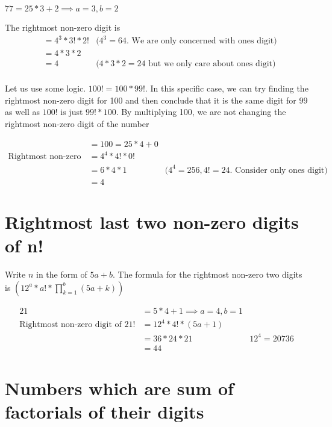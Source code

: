 
$77 = 25 * 3 + 2 \implies a = 3, b = 2$

The rightmost non-zero digit is 
\begin{align*}
    &= 4^3 * 3! * 2! &\text{($4^3 = 64$. We are only concerned with ones digit)} \\
    &= 4 * 3 * 2 \\
    &= 4 &\text{($4*3*2 = 24$ but we only care about ones digit)} \\
\end{align*}


Let us use some logic. $100! = 100 * 99!$. In this specific case, we can try finding the rightmost non-zero digit for 100 and then conclude that it is the same digit for $99$ as well as $100!$ is just $99! * 100$. By multiplying 100, we are not changing the rightmost non-zero digit of the number

\begin{align*}
    &= 100 = 25 * 4 + 0 \\
    \text{Rightmost non-zero digit} &= 4^{4} * 4! * 0! \\
    &= 6 * 4 * 1 &\text{($4^4 = 256, 4! = 24$. Consider only ones digit)} \\
    &= 4
\end{align*}

\section{Rightmost last two non-zero digits of n!}

Write $n$ in the form of $5a + b$. The formula for the rightmost non-zero two digits is $\displaystyle{\left ( 12^a * a! * \prod_{k=1} ^{b} (5a+k) \right )}$

\begin{align*}
    21 &= 5*4 + 1 \implies a=4,b=1 \\
    \text{Rightmost non-zero digit of $21!$} &= 12^4 * 4! * (5a + 1) \\
    &= 36 * 24 * 21 &\text{$12^4 = 20736$} \\
    &= 44
\end{align*}

\section{Numbers which are sum of factorials of their digits}

